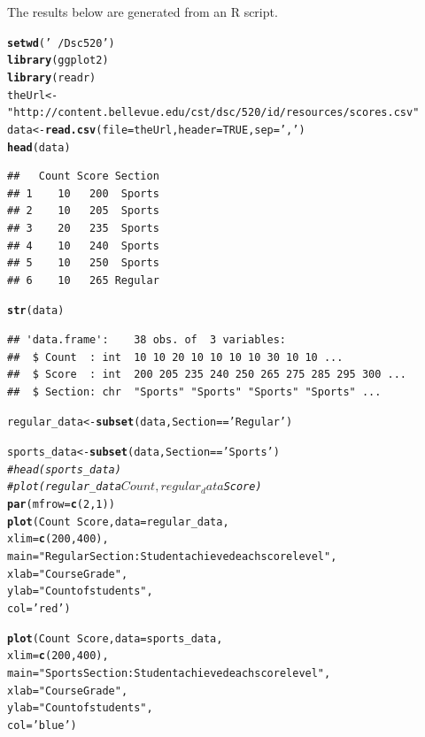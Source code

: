 \documentclass{article}\usepackage[]{graphicx}\usepackage[]{xcolor}
\makeatletter
\newcommand{\hlnum}[1]{\textcolor[rgb]{0.686,0.059,0.569}{#1}}%
\newcommand{\hlstr}[1]{\textcolor[rgb]{0.192,0.494,0.8}{#1}}%
\newcommand{\hlcom}[1]{\textcolor[rgb]{0.678,0.584,0.686}{\textit{#1}}}%
\newcommand{\hlopt}[1]{\textcolor[rgb]{0,0,0}{#1}}%
\newcommand{\hlstd}[1]{\textcolor[rgb]{0.345,0.345,0.345}{#1}}%
\newcommand{\hlkwb}[1]{\textcolor[rgb]{0.69,0.353,0.396}{#1}}%
\newcommand{\hlkwc}[1]{\textcolor[rgb]{0.333,0.667,0.333}{#1}}%
\newcommand{\hlkwd}[1]{\textcolor[rgb]{0.737,0.353,0.396}{\textbf{#1}}}%
\newenvironment{kframe}{%
 \def\at@end@of@kframe{}%
 \ifinner\ifhmode%
  \def\at@end@of@kframe{\end{minipage}}%
  \begin{minipage}{\columnwidth}%
 \fi\fi%
 \def\FrameCommand##1{\hskip\@totalleftmargin \hskip-\fboxsep
 \colorbox{shadecolor}{##1}\hskip-\fboxsep
     \hskip-\linewidth \hskip-\@totalleftmargin \hskip\columnwidth}%
 \MakeFramed {\advance\hsize-\width
   \@totalleftmargin\z@ \linewidth\hsize
   \@setminipage}}%
 {\par\unskip\endMakeFramed%
 \at@end@of@kframe}
\newenvironment{knitrout}{}{} %
\makeatother
\begin{document}
The results below are generated from an R script.

\begin{knitrout}
\color{fgcolor}\begin{kframe}
\begin{alltt}
\hlkwd{setwd}\hlstd{(}\hlstr{'~/Dsc520'}\hlstd{)}
\hlkwd{library}\hlstd{(ggplot2)}
\hlkwd{library}\hlstd{(readr)}
\hlstd{theUrl} \hlkwb{<-} \hlstr{"http://content.bellevue.edu/cst/dsc/520/id/resources/scores.csv"}
\hlstd{data} \hlkwb{<-} \hlkwd{read.csv}\hlstd{(}\hlkwc{file} \hlstd{= theUrl,} \hlkwc{header} \hlstd{=}\hlnum{TRUE}\hlstd{,} \hlkwc{sep} \hlstd{=}\hlstr{','}\hlstd{)}
\hlkwd{head}\hlstd{(data)}
\end{alltt}
\begin{verbatim}
##   Count Score Section
## 1    10   200  Sports
## 2    10   205  Sports
## 3    20   235  Sports
## 4    10   240  Sports
## 5    10   250  Sports
## 6    10   265 Regular
\end{verbatim}
\begin{alltt}
\hlkwd{str}\hlstd{(data)}
\end{alltt}
\begin{verbatim}
## 'data.frame':	38 obs. of  3 variables:
##  $ Count  : int  10 10 20 10 10 10 10 30 10 10 ...
##  $ Score  : int  200 205 235 240 250 265 275 285 295 300 ...
##  $ Section: chr  "Sports" "Sports" "Sports" "Sports" ...
\end{verbatim}
\begin{alltt}
\hlstd{regular_data} \hlkwb{<-} \hlkwd{subset}\hlstd{(data, Section}\hlopt{==}\hlstr{'Regular'}\hlstd{)}

\hlstd{sports_data} \hlkwb{<-} \hlkwd{subset}\hlstd{(data, Section}\hlopt{==}\hlstr{'Sports'}\hlstd{)}
\hlcom{#head(sports_data)}
\hlcom{#plot(regular_data$Count, regular_data$Score)}
\hlkwd{par} \hlstd{(}\hlkwc{mfrow} \hlstd{=} \hlkwd{c}\hlstd{(}\hlnum{2}\hlstd{,} \hlnum{1}\hlstd{))}
\hlkwd{plot}\hlstd{(Count} \hlopt{~} \hlstd{Score,} \hlkwc{data} \hlstd{=regular_data,}
     \hlkwc{xlim} \hlstd{=} \hlkwd{c}\hlstd{(}\hlnum{200}\hlstd{,} \hlnum{400}\hlstd{),}
     \hlkwc{main} \hlstd{=} \hlstr{"Regular Section: Student achieved each score level"}\hlstd{,}
     \hlkwc{xlab} \hlstd{=} \hlstr{"Course Grade"}\hlstd{,}
     \hlkwc{ylab} \hlstd{=} \hlstr{"Count of students"}\hlstd{,}
     \hlkwc{col} \hlstd{=} \hlstr{'red'}\hlstd{)}

\hlkwd{plot}\hlstd{(Count} \hlopt{~} \hlstd{Score,} \hlkwc{data} \hlstd{=sports_data,}
     \hlkwc{xlim} \hlstd{=} \hlkwd{c}\hlstd{(}\hlnum{200}\hlstd{,} \hlnum{400}\hlstd{),}
     \hlkwc{main} \hlstd{=} \hlstr{"Sports Section: Student achieved each score level"}\hlstd{,}
     \hlkwc{xlab} \hlstd{=} \hlstr{"Course Grade"}\hlstd{,}
     \hlkwc{ylab} \hlstd{=} \hlstr{"Count of students"}\hlstd{,}
     \hlkwc{col} \hlstd{=} \hlstr{'blue'}\hlstd{)}
\end{alltt}
\end{kframe}


\end{knitrout}
\end{document}
